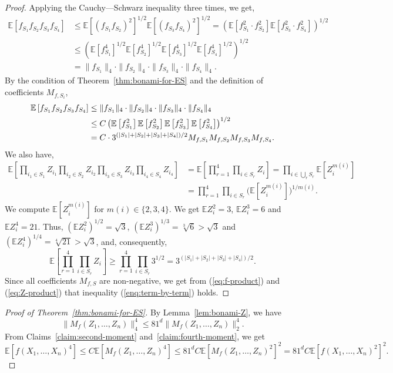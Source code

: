 \documentclass[11pt]{article}
\newcommand {\Exp}       {\mathbb{E}}
\newcommand {\E}     [1] {\Exp\left[#1\right]}
\begin{document}
\begin{proof}
Applying the Cauchy---Schwarz inequality three times, we get,
\begin{align}
\E{f_{S_1}f_{S_2}f_{S_3}f_{S_4}} &\leq \E{(f_{S_1}f_{S_2})^2}^{1/2} \E{(f_{S_3}f_{S_4})^2}^{1/2}
= \left(\E{f_{S_1}^2 \cdot f_{S_2}^2} \E{f_{S_3}^2 \cdot f_{S_4}^2}\right)^{1/2}\\
&\leq \left(\E{f_{S_1}^4}^{1/2} \E{f_{S_2}^4}^{1/2} \E{f_{S_3}^4}^{1/2} \E{f_{S_4}^4}^{1/2}\right)^{1/2}\\
&= \|f_{S_1}\|_4 \cdot \|f_{S_2}\|_4 \cdot  \|f_{S_3}\|_4 \cdot \|f_{S_4}\|_4.
\end{align}
By the condition of Theorem~\ref{thm:bonami-for-ES} and the definition of coefficients $M_{f,S_i}$,
\begin{align}\label{eq:f-product}
\E{f_{S_1}f_{S_2}f_{S_3}f_{S_4}} &\leq \|f_{S_1}\|_4 \cdot \|f_{S_2}\|_4 \cdot  \|f_{S_3}\|_4 \cdot \|f_{S_4}\|_4\\
&\leq C \left(\E{f_{S_1}^2}\E{f_{S_2}^2}\E{f_{S_3}^2}\E{f_{S_4}^2}\right)^{1/2} \\
&=
C \cdot 3^{(|S_1| + |S_2| + |S_3| + |S_4|)/2} M_{f,S_1} M_{f,S_2} M_{f,S_3} M_{f,S_4}. \notag
\end{align}
We also have,
\begin{align*}
\E{\prod_{i_1\in S_1} Z_{i_1} \prod_{i_2\in S_2} Z_{i_2} \prod_{i_3\in S_3} Z_{i_3} \prod_{i_4\in S_4} Z_{i_4}}  &=
\E{\prod_{r=1}^4\prod_{i\in S_r} Z_i}
= \prod_{i\in \bigcup_r S_r}
\E{Z_i^{m(i)}} \\
&=
\prod_{r=1}^4\prod_{i\in S_r} \Big(\E{Z_i^{m(i)}}\Big)^{1/m(i)}.
\end{align*}
We compute $\E{Z_i^{m(i)}}$ for $m(i)\in\{2,3, 4\}$. We get $\Exp Z_i^2 = 3$, $\Exp Z_i^3 = 6$ and $\Exp Z_i^4 = 21$.
Thus, $(\Exp Z_i^2)^{1/2} = \sqrt{3}$, $(\Exp Z_i^3)^{1/3} = \sqrt[3]{6}> \sqrt{3}$ and $(\Exp Z_i^4)^{1/4} = \sqrt[4]{21} > \sqrt{3}$,
and, consequently,
\begin{equation}\label{eq:Z-product}
\E{\prod_{r=1}^4\prod_{i\in S_r} Z_i} \geq \prod_{r=1}^4 \prod_{i\in S_r} 3^{1/2} = 3^{(|S_1| + |S_2| + |S_3| + |S_4|)/2}.
\end{equation}
Since all coefficients $M_{f,S}$ are non-negative, we get from (\ref{eq:f-product}) and (\ref{eq:Z-product})  that  inequality (\ref{enq:term-by-term}) holds.
\end{proof}

\begin{proof}[Proof of Theorem~\ref{thm:bonami-for-ES}]
By Lemma~\ref{lem:bonami-Z}, we have
$$\|M_f(Z_1,\dots,Z_n)\|_4^4 \leq 81^d \|M_f(Z_1,\dots,Z_n)\|_2^4.$$
From Claims~\ref{claim:second-moment} and~\ref{claim:fourth-moment}, we get
$$\E{f(X_1,\dots,X_n)^4} \leq C\E{M_f(Z_1,\dots,Z_n)^4} \leq 81^d C \E{M_f(Z_1,\dots,Z_n)^2}^2  =
81^d C \E{f(X_1,\dots, X_n)^2}^2.$$
\end{proof}
\end{document}
